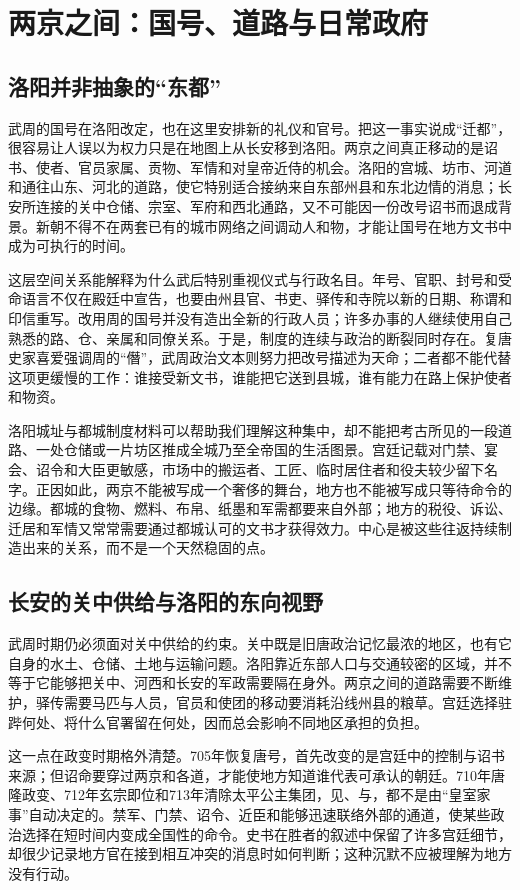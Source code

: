 \section{两京之间：国号、道路与日常政府}
\label{sec:wu-zhou-dual-capitals}
\subsection{洛阳并非抽象的“东都”}
武周的国号在洛阳改定，也在这里安排新的礼仪和官号。把这一事实说成“迁都”，很容易让人误以为权力只是在地图上从长安移到洛阳。两京之间真正移动的是诏书、使者、官员家属、贡物、军情和对皇帝近侍的机会。洛阳的宫城、坊市、河道和通往山东、河北的道路，使它特别适合接纳来自东部州县和东北边情的消息；长安所连接的关中仓储、宗室、军府和西北通路，又不可能因一份改号诏书而退成背景。新朝不得不在两套已有的城市网络之间调动人和物，才能让国号在地方文书中成为可执行的时间。

这层空间关系能解释为什么武后特别重视仪式与行政名目。年号、官职、封号和受命语言不仅在殿廷中宣告，也要由州县官、书吏、驿传和寺院以新的日期、称谓和印信重写。改用周的国号并没有造出全新的行政人员；许多办事的人继续使用自己熟悉的路、仓、亲属和同僚关系。于是，制度的连续与政治的断裂同时存在。复唐史家喜爱强调周的“僭”，武周政治文本则努力把改号描述为天命；二者都不能代替这项更缓慢的工作：谁接受新文书，谁能把它送到县城，谁有能力在路上保护使者和物资。

洛阳城址与都城制度材料可以帮助我们理解这种集中，却不能把考古所见的一段道路、一处仓储或一片坊区推成全城乃至全帝国的生活图景。宫廷记载对门禁、宴会、诏令和大臣更敏感，市场中的搬运者、工匠、临时居住者和役夫较少留下名字。正因如此，两京不能被写成一个奢侈的舞台，地方也不能被写成只等待命令的边缘。都城的食物、燃料、布帛、纸墨和军需都要来自外部；地方的税役、诉讼、迁居和军情又常常需要通过都城认可的文书才获得效力。中心是被这些往返持续制造出来的关系，而不是一个天然稳固的点。

\subsection{长安的关中供给与洛阳的东向视野}
武周时期仍必须面对关中供给的约束。关中既是旧唐政治记忆最浓的地区，也有它自身的水土、仓储、土地与运输问题。洛阳靠近东部人口与交通较密的区域，并不等于它能够把关中、河西和长安的军政需要隔在身外。两京之间的道路需要不断维护，驿传需要马匹与人员，官员和使团的移动要消耗沿线州县的粮草。宫廷选择驻跸何处、将什么官署留在何处，因而总会影响不同地区承担的负担。

这一点在政变时期格外清楚。705年恢复唐号，首先改变的是宫廷中的控制与诏书来源；但诏命要穿过两京和各道，才能使地方知道谁代表可承认的朝廷。710年唐隆政变、712年玄宗即位和713年清除太平公主集团，见、与，都不是由“皇室家事”自动决定的。禁军、门禁、诏令、近臣和能够迅速联络外部的通道，使某些政治选择在短时间内变成全国性的命令。史书在胜者的叙述中保留了许多宫廷细节，却很少记录地方官在接到相互冲突的消息时如何判断；这种沉默不应被理解为地方没有行动。

